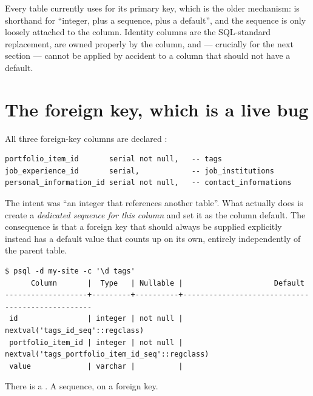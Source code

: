 \begin{pattern}
Every table currently uses  for its primary key, which is the older mechanism:
 is shorthand for ``integer, plus a sequence, plus a default'', and the sequence is
only loosely attached to the column. Identity columns are the SQL-standard replacement, are owned
properly by the column, and --- crucially for the next section --- cannot be applied by accident to
a column that should not have a default.
\end{pattern}

\section{The  foreign key, which is a live bug}
\label{sec:serialfk}

All three foreign-key columns are declared :

\begin{lstlisting}[style=sql,caption={From the three \file{up.sql} files.}]
portfolio_item_id       serial not null,   -- tags
job_experience_id       serial,            -- job_institutions
personal_information_id serial not null,   -- contact_informations
\end{lstlisting}

The intent was ``an integer that references another table''. What  actually does is
create a \emph{dedicated sequence for this column} and set it as the column default. The
consequence is that a foreign key that should always be supplied explicitly instead has a default
value that counts up on its own, entirely independently of the parent table.

\begin{verified}
\begin{lstlisting}[style=out]
$ psql -d my-site -c '\d tags'
      Column       |  Type   | Nullable |                     Default
-------------------+---------+----------+-------------------------------------------------
 id                | integer | not null | nextval('tags_id_seq'::regclass)
 portfolio_item_id | integer | not null | nextval('tags_portfolio_item_id_seq'::regclass)
 value             | varchar |          |
\end{lstlisting}
There is a . A sequence, on a foreign key.
\end{verified}

